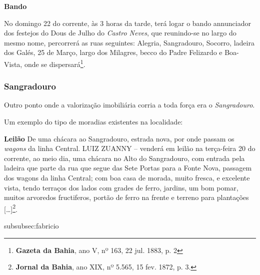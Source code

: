 \begin{citacao}
\textbf{Bando}

No domingo 22 do corrente, às 3 horas da tarde, terá logar o bando annunciador dos festejos do Dous de Julho do \textit{Castro Neves}, que reunindo-se no largo do mesmo nome, percorrerá as ruas seguintes: Alegria, Sangradouro, Socorro, ladeira dos Galés, 25 de Março, largo dos Milagres, becco do Padre Felizardo e Boa-Vista, onde se dispersará\footnote{\textbf{Gazeta da Bahia}, ano V, nº 163, 22 jul. 1883, p. 2}.
\end{citacao}

\subsubsection{Sangradouro}\label{subsubsec:sangradouro}

Outro ponto onde a valorização imobiliária corria a toda força era o \textit{Sangradouro}.

Um exemplo do tipo de moradias existentes na localidade:

\begin{citacao}
\textbf{Leilão}
De uma chácara ao Sangradouro, estrada nova, por onde passam os \textit{wagons} da linha Central.
LUIZ ZUANNY -- venderá em leilão na terça-feira 20 do corrente, ao meio dia, uma chácara no Alto do Sangradouro, com entrada pela ladeira que parte da rua que segue das Sete Portas para a Fonte Nova, passagem dos wagons da linha Central; com boa casa de morada, muito fresca, e excelente vista, tendo terraços dos lados com grades de ferro, jardins, um bom pomar, muitos arvoredos fructiferos, portão de ferro na frente e terreno para plantações [\dots]\footnote{\textbf{Jornal da Bahia}, ano XIX, nº 5.565, 15 fev. 1872, p. 3.}.
\end{citacao}

subsubsec:fabricio

